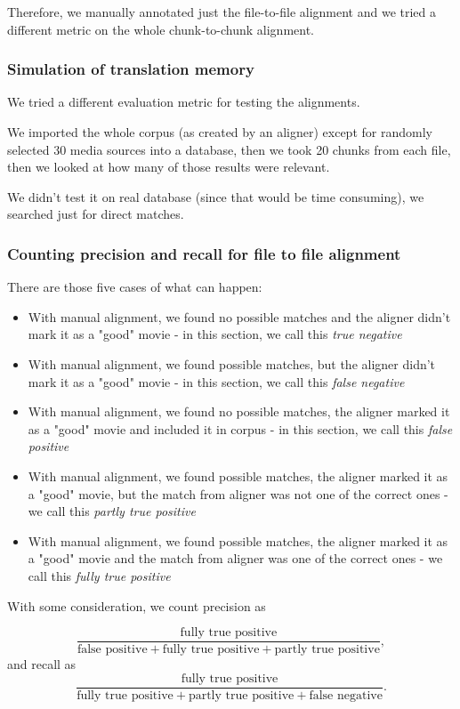 Therefore, we manually annotated just the file-to-file alignment and we tried a different metric on the whole chunk-to-chunk alignment.

\subsubsection{Simulation of translation memory}
We tried a different evaluation metric for testing the alignments.

We imported the whole corpus (as created by an aligner) except for randomly selected 30 media sources into a database, then we took 20 chunks from each file, then we looked at how many of those results were relevant.

We didn't test it on real database (since that would be time consuming), we searched just for direct matches.

\subsubsection{Counting precision and recall for file to file alignment}
There are those five cases of what can happen:
\begin{itemize}
    \item With manual alignment, we found no possible matches and the aligner didn't mark it as a "good" movie - in this section, we call this \textit{true negative}
    \item With manual alignment, we found possible matches, but the aligner didn't mark it as a "good" movie - in this section, we call this \textit{false negative}
    \item With manual alignment, we found no possible matches, the aligner marked it as a "good" movie and included it in corpus - in this section, we call this \textit{false positive}
    \item With manual alignment, we found possible matches, the aligner marked it as a "good" movie, but the match from aligner was not one of the correct ones -  we call this \textit{partly true positive}
    \item  With manual alignment, we found possible matches, the aligner marked it as a "good" movie and the match from aligner was  one of the correct ones -  we call this \textit{fully true positive}
\end{itemize}

With some consideration, we count precision as 

$$\frac{\text{fully true positive}}{\text{false positive}+\text{fully true positive}+\text{partly true positive}},$$ and recall as $$\frac{\text{fully true positive}}{\text{fully true positive}+\text{partly true positive}+\text{false negative}}.$$

